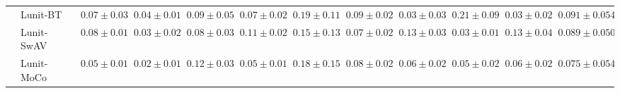 \begin{tabular}{ll|cccc|c|cccc|c}
 & Lunit-BT~\cite{kang2023benchmarking} & $0.07 \pm 0.03$ & $0.04 \pm 0.01$ & $0.09 \pm 0.05$ & $0.07 \pm 0.02$ & $0.19 \pm 0.11$ & $0.09 \pm 0.02$ & $0.03 \pm 0.03$ & $0.21 \pm 0.09$ & $0.03 \pm 0.02$ & $0.091 \pm 0.054$ \\
 & Lunit-SwAV~\cite{kang2023benchmarking} & $0.08 \pm 0.01$ & $0.03 \pm 0.02$ & $0.08 \pm 0.03$ & $0.11 \pm 0.02$ & $0.15 \pm 0.13$ & $0.07 \pm 0.02$ & $0.13 \pm 0.03$ & $0.03 \pm 0.01$ & $0.13 \pm 0.04$ & $0.089 \pm 0.050$ \\
 & Lunit-MoCo~\cite{kang2023benchmarking} & $0.05 \pm 0.01$ & $0.02 \pm 0.01$ & $0.12 \pm 0.03$ & $0.05 \pm 0.01$ & $0.18 \pm 0.15$ & $0.08 \pm 0.02$ & $0.06 \pm 0.02$ & $0.05 \pm 0.02$ & $0.06 \pm 0.02$ & $0.075 \pm 0.054$ \\
\cline{1-12}
\bottomrule
\end{tabular}
